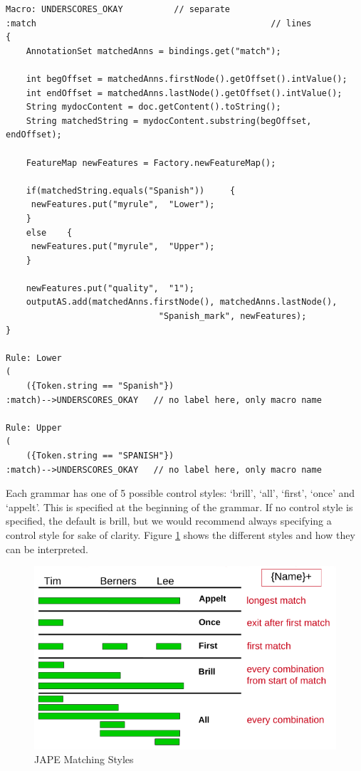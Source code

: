\begin{small}
\begin{verbatim}
Macro: UNDERSCORES_OKAY          // separate
:match                                              // lines
{
    AnnotationSet matchedAnns = bindings.get("match");

    int begOffset = matchedAnns.firstNode().getOffset().intValue();
    int endOffset = matchedAnns.lastNode().getOffset().intValue();
    String mydocContent = doc.getContent().toString();
    String matchedString = mydocContent.substring(begOffset, endOffset);

    FeatureMap newFeatures = Factory.newFeatureMap();

    if(matchedString.equals("Spanish"))     {
     newFeatures.put("myrule",  "Lower");
    }
    else    {
     newFeatures.put("myrule",  "Upper");
    }

    newFeatures.put("quality",  "1");
    outputAS.add(matchedAnns.firstNode(), matchedAnns.lastNode(),
                              "Spanish_mark", newFeatures);
}

Rule: Lower
(
    ({Token.string == "Spanish"})
:match)-->UNDERSCORES_OKAY   // no label here, only macro name

Rule: Upper
(
    ({Token.string == "SPANISH"})
:match)-->UNDERSCORES_OKAY   // no label here, only macro name

 \end{verbatim}
\end{small}


Each grammar has one of 5 possible control styles: `brill', `all',
`first', `once' and `appelt'. This is specified at the beginning of the
grammar. If no control style is specified, the default is brill, but we would recommend always specifying a control style for sake of clarity.
Figure \ref{fig:jape:matching-styles} shows the different styles and how they can be interpreted.

\begin{figure}[htb]
\begin{center}
\includegraphics[scale=0.5]{jape-matching-styles.png}
\caption{JAPE Matching Styles}
\label{fig:jape:matching-styles}
\end{center}
\end{figure}

